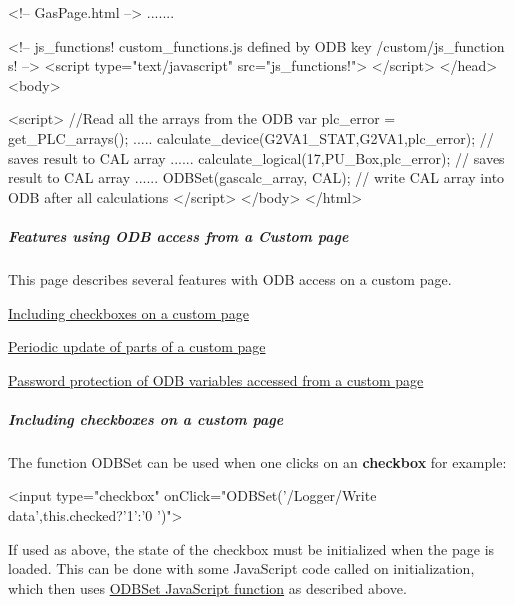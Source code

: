 \begin{DoxyCode}
<!-- GasPage.html -->
.......

<!-- js_functions!   custom_functions.js defined by  ODB key  /custom/js_function
      s!  -->
\htmlonly <script type="text/javascript"  src="js_functions!">
</script> \endhtmlonly
</head><body>


\htmlonly <script>
//Read all the arrays from the ODB
var plc_error = get_PLC_arrays();
.....
calculate_device(G2VA1_STAT,G2VA1,plc_error); // saves result to CAL array
......
calculate_logical(17,PU_Box,plc_error); // saves result to CAL array
......
ODBSet(gascalc_array, CAL); // write CAL array into ODB after all calculations
</script> \endhtmlonly
</body>
</html>
\end{DoxyCode}




\par
 \label{index_end}
\hypertarget{index_end}{}
 \subparagraph{Features using ODB access from a Custom page}\label{RC_mhttpd_custom_ODB_access_features}
\par




\par
 This page describes several features with ODB access on a custom page.


\begin{DoxyItemize}
\item \hyperlink{RC_mhttpd_custom_ODB_access_features_RC_mhttpd_custom_checkboxes}{Including checkboxes on a custom page}
\item \hyperlink{RC_mhttpd_custom_ODB_access_features_RC_mhttpd_js_update_part}{Periodic update of parts of a custom page}
\item \hyperlink{RC_mhttpd_custom_ODB_access_features_RC_mhttpd_custom_pw_protection}{Password protection of ODB variables accessed from a custom page}
\end{DoxyItemize}\hypertarget{RC_mhttpd_custom_ODB_access_features_RC_mhttpd_custom_checkboxes}{}\subparagraph{Including checkboxes on a custom page}\label{RC_mhttpd_custom_ODB_access_features_RC_mhttpd_custom_checkboxes}
The function ODBSet can be used when one clicks on an {\bfseries checkbox} for example: 
\begin{DoxyCode}
  <input type="checkbox" onClick="ODBSet('/Logger/Write data',this.checked?'1':'0
      ')">
\end{DoxyCode}


If used as above, the state of the checkbox must be initialized when the page is loaded. This can be done with some JavaScript code called on initialization, which then uses \hyperlink{RC_mhttpd_custom_ODB_access_RC_mhttpd_custom_odbset}{ODBSet JavaScript function} as described above.

